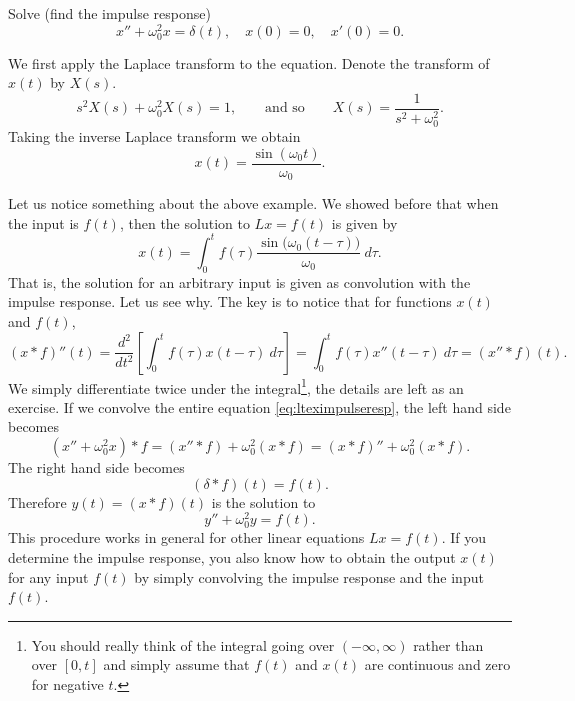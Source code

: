 \begin{example}
Solve (find the impulse response)
\begin{equation} \label{eq:lteximpulseresp}
x'' + \omega_0^2 x = \delta(t) , \quad x(0) = 0, \quad x'(0) = 0 .
\end{equation}

We first apply the Laplace transform to the equation.  Denote
the transform of $x(t)$ by $X(s)$.
\begin{equation*}
s^2 X(s) + \omega_0^2 X(s) = 1 ,
\qquad \text{and so} \qquad
X(s) = \frac{1}{s^2+ \omega_0^2} .
\end{equation*}
Taking the inverse Laplace transform we obtain
\begin{equation*}
x(t) = 
\frac{\sin (\omega_0 t)}{\omega_0} .
\end{equation*}
\end{example}

Let us notice something about the above example.  We showed before that
when the input is $f(t)$, then the solution to $Lx = f(t)$
is given by
\begin{equation*}
x(t) = 
\int_0^t
f(\tau) 
\frac{\sin \bigl( \omega_0 (t-\tau) \bigr)}{\omega_0} ~ d\tau .
\end{equation*}
That is, the solution for an arbitrary input is given as
convolution with the impulse response.  Let us see why.
The key is to notice that for functions $x(t)$ and $f(t)$,
\begin{equation*}
(x * f)''(t) =
\frac{d^2}{dt^2}\left[
\int_0^t
f(\tau) 
x(t-\tau) ~ d\tau \right]
=
\int_0^t
f(\tau) 
x''(t-\tau) ~ d\tau
= (x'' * f)(t) .
\end{equation*}
We simply differentiate twice under the
integral\footnote{You should really think of the integral going over
$(-\infty,\infty)$ rather than over $[0,t]$ and simply assume that $f(t)$ and
$x(t)$ are continuous and zero for negative $t$.}, the details are
left as an exercise.
If we convolve the entire equation \eqref{eq:lteximpulseresp},
the left hand side becomes
\begin{equation*}
(x'' + \omega_0^2 x) * f =
(x'' * f) + \omega_0^2 (x * f) =
(x * f)'' + \omega_0^2 (x * f) .
\end{equation*}
The right hand side becomes
\begin{equation*}
(\delta * f)(t) = f(t).
\end{equation*}
Therefore $y(t) = (x * f)(t)$ is the solution to
\begin{equation*}
y'' + \omega_0^2 y = f(t) .
\end{equation*}
This procedure works in general for other linear
equations $Lx = f(t)$.  If you determine the impulse response,
you also know how to obtain the output $x(t)$ for any input $f(t)$
by simply convolving
the impulse response and the input $f(t)$.

